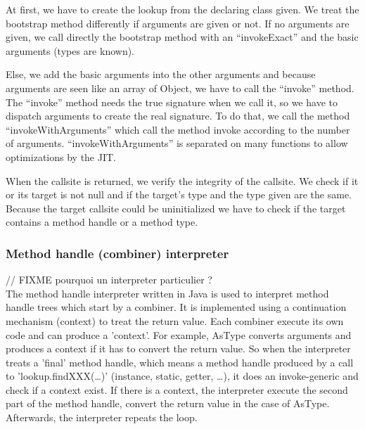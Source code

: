 \documentclass{sig-alternate}
\newcommand{\fixme}[1]{{\color{red} // FIXME #1}\\}
\begin{document}
        

        At first, we have to create the lookup from the declaring class given.
        We treat the bootstrap method differently if arguments are given or not.
        If no arguments are given, we call directly the bootstrap method
        with an ``invokeExact'' and the basic arguments (types are known).

        Else, we add the basic arguments into the other arguments
        and because arguments are seen like an array of Object,
        we have to call the ``invoke'' method.
        The ``invoke'' method needs the true signature when we call it,
        so we have to dispatch arguments to create the real signature.
        To do that, we call the method ``invokeWithArguments''%
        which call the method invoke according to the number of arguments.
        ``invokeWithArguments'' is separated on many functions to allow optimizations by the JIT.

        

        When the callsite is returned, we verify the integrity of the callsite.
        We check if it or its target is not null and if the target's type and the type given are the same.
        Because the target callsite could be uninitialized we have to check if the target contains a method handle or a method type.

      \subsubsection{Method handle (combiner) interpreter}

        \fixme{pourquoi un interpreter particulier ?}

        The method handle interpreter written in Java
        is used to interpret method handle trees which start by a combiner.
        It is implemented using a continuation mechanism (context) to treat the return value.
        Each combiner execute its own code and can produce a 'context'.
        For example, AsType converts arguments and produces a context if it has to convert the return value.
        So when the interpreter treats a 'final' method handle,
        which means a method handle produced by a call to 'lookup.findXXX(\dots)' (instance, static, getter, \dots),
        it does an invoke-generic and check if a context exist.
        If there is a context, the interpreter execute the second part of the method handle,
        convert the return value in the case of AsType.
        Afterwards, the interpreter repeats the loop.
\end{document}
